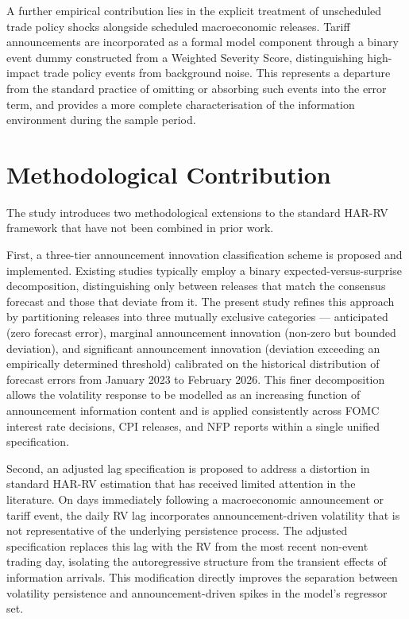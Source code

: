 \documentclass[12pt,a4paper]{report}
\begin{document}
A further empirical contribution lies in the explicit treatment of unscheduled trade policy shocks alongside scheduled macroeconomic releases. Tariff announcements are incorporated as a formal model component through a binary event dummy constructed from a Weighted Severity Score, distinguishing high-impact trade policy events from background noise. This represents a departure from the standard practice of omitting or absorbing such events into the error term, and provides a more complete characterisation of the information environment during the sample period.

\section{Methodological Contribution}
The study introduces two methodological extensions to the standard HAR-RV framework that have not been combined in prior work.

First, a three-tier announcement innovation classification scheme is proposed and implemented. Existing studies typically employ a binary expected-versus-surprise decomposition, distinguishing only between releases that match the consensus forecast and those that deviate from it. The present study refines this approach by partitioning releases into three mutually exclusive categories --- anticipated (zero forecast error), marginal announcement innovation (non-zero but bounded deviation), and significant announcement innovation (deviation exceeding an empirically determined threshold) calibrated on the historical distribution of forecast errors from January 2023 to February 2026. This finer decomposition allows the volatility response to be modelled as an increasing function of announcement information content and is applied consistently across FOMC interest rate decisions, CPI releases, and NFP reports within a single unified specification.

Second, an adjusted lag specification is proposed to address a distortion in standard HAR-RV estimation that has received limited attention in the literature. On days immediately following a macroeconomic announcement or tariff event, the daily RV lag incorporates announcement-driven volatility that is not representative of the underlying persistence process. The adjusted specification replaces this lag with the RV from the most recent non-event trading day, isolating the autoregressive structure from the transient effects of information arrivals. This modification directly improves the separation between volatility persistence and announcement-driven spikes in the model's regressor set.
\end{document}
